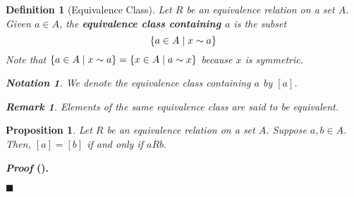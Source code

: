 \documentclass[12pt,a4paper]{article}
\newtheorem{nota}{Notation}[section]
\newtheorem{df}{Definition}[subsection]
\newtheorem{prop}{Proposition}[subsection]
\newcounter{nprf}[subsection]
\newtheorem*{rmk}{\indent Remark}
\newenvironment*{prf}{\par\indent\textbf{\textit{Proof} (\stepcounter{nprf}\thenprf). }\par }{\par\hfill $\blacksquare$\par}
\begin{document}
\begin{df}[Equivalence Class]\label{df4.2.5}
	Let $R$ be an equivalence relation on a set $A$. Given $a\in A$, the \textbf{equivalence class containing $a$} is the subset \[\qty{a\in A\mid x\sim a}\] Note that $\qty{a\in A\mid x\sim a}=\qty{x\in A\mid a\sim x}$ because $x$ is symmetric.
\begin{nota} We denote the equivalence class containing $a$ by $[a]$. \end{nota}
\begin{rmk} Elements of the same equivalence class are said to be \textit{equivalent}. \end{rmk}
\end{df}
\begin{framed}
\begin{prop}\label{prop4.2.1} Let $R$ be an equivalence relation on a set $A$. Suppose $a,b\in A$. Then, $[a]=[b]$ if and only if $aRb.$ \end{prop}
\begin{prf}

\end{prf}
\end{framed}
\end{document}
